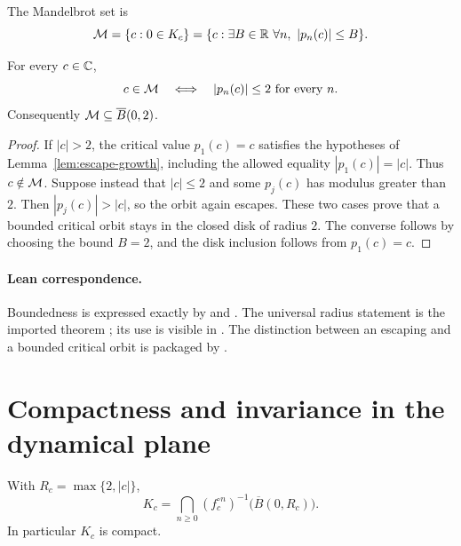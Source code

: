 \begin{definition}
\label{def:mandelbrot}
The Mandelbrot set is
\[
 \mathcal M=\{c:0\in K_c\}
    =\{c:\exists B\in\mathbb R\ \forall n,\ |p_n(c)|\le B\}.
\]
\end{definition}

\begin{theorem}
\label{thm:critical-bound}
For every $c\in\mathbb C$,
\[
 c\in\mathcal M\quad\Longleftrightarrow\quad
 |p_n(c)|\le2\text{ for every }n.
\]
Consequently $\mathcal M\subseteq\overline B(0,2)$.
\end{theorem}

\begin{proof}
If $|c|>2$, the critical value $p_1(c)=c$ satisfies the hypotheses of
Lemma~\ref{lem:escape-growth}, including the allowed equality
$|p_1(c)|=|c|$.  Thus $c\notin\mathcal M$.
Suppose instead that $|c|\le2$ and some $p_j(c)$ has modulus greater
than $2$.  Then $|p_j(c)|>|c|$, so the orbit again escapes.
These two cases prove that a bounded critical orbit stays in the closed
disk of radius $2$.  The converse follows by choosing the bound $B=2$,
and the disk inclusion follows from $p_1(c)=c$.
\end{proof}

\paragraph{Lean correspondence.}
Boundedness is expressed exactly by
and
.
The universal radius statement is the imported theorem
; its use is visible in
.
The distinction between an escaping and a bounded critical orbit is
packaged by
.

\section{Compactness and invariance in the dynamical plane}

\begin{proposition}
\label{prop:filled-julia-compact}
With $R_c=\max\{2,|c|\}$,
\[
 K_c=\bigcap_{n\ge0}(f_c^{\circ n})^{-1}
                       \bigl(\overline B(0,R_c)\bigr).
\]
In particular $K_c$ is compact.
\end{proposition}

